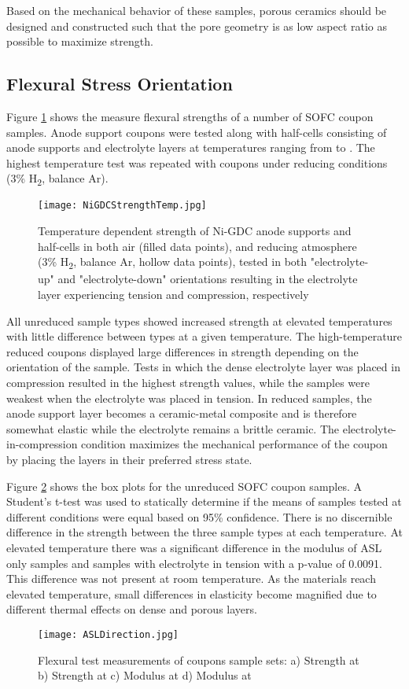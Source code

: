 Based on the mechanical behavior of these samples, porous ceramics should be designed and constructed such that the pore geometry is as low aspect ratio as possible to maximize strength.

\subsection{Flexural Stress Orientation}

Figure \ref{fig:NiGDCHalfCells} shows the measure flexural strengths of a number of SOFC coupon samples.
Anode support coupons were tested along with half-cells consisting of anode supports and electrolyte layers at temperatures ranging from  to .
The highest temperature test was repeated with coupons under reducing conditions (3\% H\textsubscript{2}, balance Ar).
\begin{figure}
    \texttt{[image: NiGDCStrengthTemp.jpg]}
    \caption{Temperature dependent strength of Ni-GDC anode supports and half-cells in both air (filled data points), and reducing atmosphere (3\% H\textsubscript{2}, balance Ar, hollow data points), tested in both "electrolyte-up" and "electrolyte-down" orientations resulting in the electrolyte layer experiencing tension and compression, respectively}
    \label{fig:NiGDCHalfCells}
\end{figure}

All unreduced sample types showed increased strength at elevated temperatures with little difference between types at a given temperature.
The high-temperature reduced coupons displayed large differences in strength depending on the orientation of the sample.
Tests in which the dense electrolyte layer was placed in compression resulted in the highest strength values, while the samples were weakest when the electrolyte was placed in tension.
In reduced samples, the anode support layer becomes a ceramic-metal composite and is therefore somewhat elastic while the electrolyte remains a brittle ceramic.
The electrolyte-in-compression condition maximizes the mechanical performance of the coupon by placing the layers in their preferred stress state.

Figure \ref{fig:ASLDirection} shows the box plots for the unreduced SOFC coupon samples.
A Student's t-test was used to statically determine if the means of samples tested at different conditions were equal based on 95\% confidence.
There is no discernible difference in the strength between the three sample types at each temperature.
At elevated temperature there was a significant difference in the modulus of ASL only samples and samples with electrolyte in tension with a p-value of 0.0091.
This difference was not present at room temperature.
As the materials reach elevated temperature, small differences in elasticity become magnified due to different thermal effects on dense and porous layers.
\begin{figure}
    \texttt{[image: ASLDirection.jpg]}
    \caption{Flexural test measurements of coupons sample sets: a) Strength at  b) Strength at  c) Modulus at  d) Modulus at }
    \label{fig:ASLDirection}
\end{figure}

